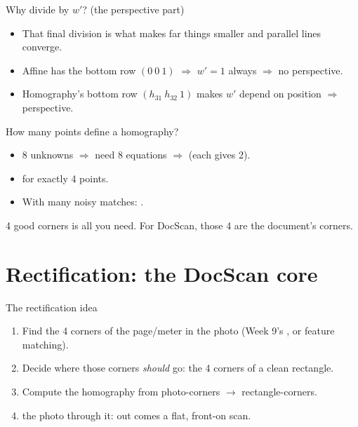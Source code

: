 \documentclass[10pt,aspectratio=169]{beamer}
\begin{document}
\begin{frame}{Why divide by $w'$? (the perspective part)}
  \begin{itemize}
    \item That final division is what makes far things smaller and parallel lines converge.
    \item Affine has the bottom row $(0\ 0\ 1)$ $\Rightarrow$ $w'=1$ always $\Rightarrow$ no perspective.
    \item Homography's bottom row $(h_{31}\ h_{32}\ 1)$ makes $w'$ depend on position $\Rightarrow$ perspective.
  \end{itemize}
\end{frame}

\begin{frame}{How many points define a homography?}
  \begin{itemize}
    \item 8 unknowns $\Rightarrow$ need 8 equations $\Rightarrow$  (each gives 2).
    \item {} for exactly 4 points.
    \item With many noisy matches: .
  \end{itemize}
  \begin{goodbox}
    4 good corners is all you need. For DocScan, those 4 are the document's corners.
  \end{goodbox}
\end{frame}

\section{Rectification: the DocScan core}

\begin{frame}{The rectification idea}
  \begin{enumerate}
    \item Find the 4 corners of the page/meter in the photo (Week 9's , or feature matching).
    \item Decide where those corners \emph{should} go: the 4 corners of a clean rectangle.
    \item Compute the homography from photo-corners $\rightarrow$ rectangle-corners.
    \item {} the photo through it: out comes a flat, front-on scan.
  \end{enumerate}
\end{frame}
\end{document}
